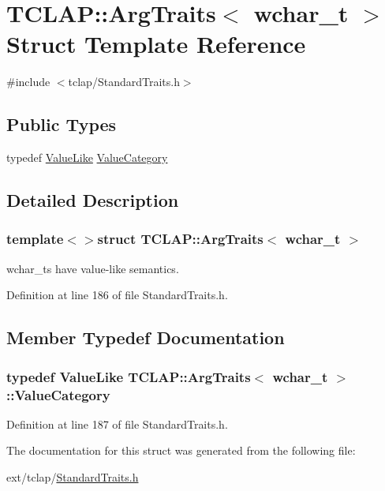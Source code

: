 \hypertarget{struct_t_c_l_a_p_1_1_arg_traits_3_01wchar__t_01_4}{}\section{T\+C\+L\+A\+P\+:\+:Arg\+Traits$<$ wchar\+\_\+t $>$ Struct Template Reference}
\label{struct_t_c_l_a_p_1_1_arg_traits_3_01wchar__t_01_4}


{\ttfamily \#include $<$tclap/\+Standard\+Traits.\+h$>$}

\subsection*{Public Types}
\begin{DoxyCompactItemize}
\item 
typedef \hyperlink{struct_t_c_l_a_p_1_1_value_like}{Value\+Like} \hyperlink{struct_t_c_l_a_p_1_1_arg_traits_3_01wchar__t_01_4_a49a311297a394637af4d8d64eda7f442}{Value\+Category}
\end{DoxyCompactItemize}


\subsection{Detailed Description}
\subsubsection*{template$<$$>$struct T\+C\+L\+A\+P\+::\+Arg\+Traits$<$ wchar\+\_\+t $>$}

wchar\+\_\+ts have value-\/like semantics. 

Definition at line 186 of file Standard\+Traits.\+h.



\subsection{Member Typedef Documentation}
\hypertarget{struct_t_c_l_a_p_1_1_arg_traits_3_01wchar__t_01_4_a49a311297a394637af4d8d64eda7f442}{}
\subsubsection[{Value\+Category}]{\setlength{\rightskip}{0pt plus 5cm}typedef {\bf Value\+Like} {\bf T\+C\+L\+A\+P\+::\+Arg\+Traits}$<$ wchar\+\_\+t $>$\+::{\bf Value\+Category}}\label{struct_t_c_l_a_p_1_1_arg_traits_3_01wchar__t_01_4_a49a311297a394637af4d8d64eda7f442}


Definition at line 187 of file Standard\+Traits.\+h.



The documentation for this struct was generated from the following file\+:\begin{DoxyCompactItemize}
\item 
ext/tclap/\hyperlink{_standard_traits_8h}{Standard\+Traits.\+h}\end{DoxyCompactItemize}
